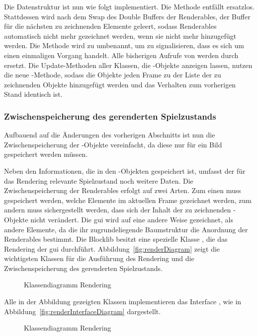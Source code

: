 Die Datenstruktur ist nun wie folgt implementiert. Die Methode  entfällt ersatzlos. Stattdessen wird nach dem Swap des Double Buffers der Renderables, der Buffer für die nächsten zu zeichnenden Elemente geleert, sodass Renderables automatisch nicht mehr gezeichnet werden, wenn sie nicht mehr hinzugefügt werden. Die Methode  wird zu  umbenannt, um zu signalisieren, dass es sich um einen einmaligen Vorgang handelt. Alle bisherigen Aufrufe von  werden durch  ersetzt. Die Update-Methoden aller Klassen, die -Objekte anzeigen lassen, nutzen die neue -Methode, sodass die Objekte jeden Frame zu der Liste der zu zeichnenden Objekte hinzugefügt werden und das Verhalten zum vorherigen Stand identisch ist.

\subsubsection{Zwischenspeicherung des gerenderten Spielzustands}\label{sec:saveRenderState}
Aufbauend auf die Änderungen des vorherigen Abschnitts ist nun die Zwischenspeicherung der -Objekte vereinfacht, da diese nur für ein Bild gespeichert werden müssen. 

Neben den Informationen, die in den  -Objekten gespeichert ist, umfasst der für das Rendering relevante Spielzustand noch weitere Daten. Die Zwischenspeicherung der Renderables erfolgt auf zwei Arten. Zum einen muss gespeichert werden, welche Elemente im aktuellen Frame gezeichnet werden, zum andern muss sichergestellt werden, dass sich der Inhalt der zu zeichnenden -Objekte nicht verändert. Die \ac{gui} wird auf eine andere Weise gezeichnet, als andere Elemente, da die ihr zugrundeliegende Baumstruktur die Anordnung der Renderables bestimmt. Die Blocklib besitzt eine spezielle Klasse , die das Rendering der \ac{gui} durchführt. Abbildung~\vref{fig:renderDiagram} zeigt die wichtigsten Klassen für die Ausführung des Rendering und die Zwischenspeicherung des gerenderten Spielzustands.
\begin{figure}
	\centering
	
	\caption{Klassendiagramm Rendering}\label{fig:renderDiagram}
\end{figure}
Alle in der Abbildung gezeigten Klassen implementieren das Interface , wie in Abbildung~\vref{fig:renderInterfaceDiagram} dargestellt.
\begin{figure}
	\centering
	
	\caption{Klassendiagramm Rendering}\label{fig:renderInterfaceDiagram}
\end{figure}



